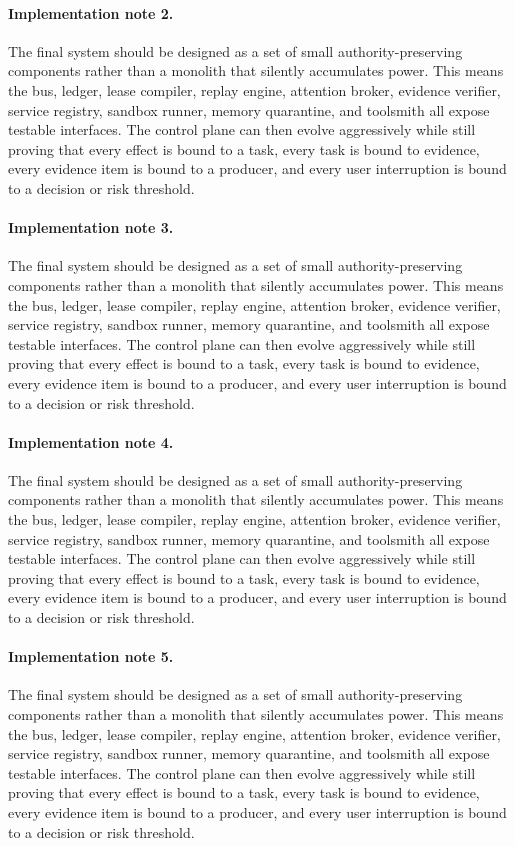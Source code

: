 \documentclass[10pt,journal,onecolumn]{IEEEtran}
\begin{document}
\paragraph{Implementation note 2.} The final system should be designed as a set of small authority-preserving components rather than a monolith that silently accumulates power. This means the bus, ledger, lease compiler, replay engine, attention broker, evidence verifier, service registry, sandbox runner, memory quarantine, and toolsmith all expose testable interfaces. The control plane can then evolve aggressively while still proving that every effect is bound to a task, every task is bound to evidence, every evidence item is bound to a producer, and every user interruption is bound to a decision or risk threshold.
\paragraph{Implementation note 3.} The final system should be designed as a set of small authority-preserving components rather than a monolith that silently accumulates power. This means the bus, ledger, lease compiler, replay engine, attention broker, evidence verifier, service registry, sandbox runner, memory quarantine, and toolsmith all expose testable interfaces. The control plane can then evolve aggressively while still proving that every effect is bound to a task, every task is bound to evidence, every evidence item is bound to a producer, and every user interruption is bound to a decision or risk threshold.
\paragraph{Implementation note 4.} The final system should be designed as a set of small authority-preserving components rather than a monolith that silently accumulates power. This means the bus, ledger, lease compiler, replay engine, attention broker, evidence verifier, service registry, sandbox runner, memory quarantine, and toolsmith all expose testable interfaces. The control plane can then evolve aggressively while still proving that every effect is bound to a task, every task is bound to evidence, every evidence item is bound to a producer, and every user interruption is bound to a decision or risk threshold.
\paragraph{Implementation note 5.} The final system should be designed as a set of small authority-preserving components rather than a monolith that silently accumulates power. This means the bus, ledger, lease compiler, replay engine, attention broker, evidence verifier, service registry, sandbox runner, memory quarantine, and toolsmith all expose testable interfaces. The control plane can then evolve aggressively while still proving that every effect is bound to a task, every task is bound to evidence, every evidence item is bound to a producer, and every user interruption is bound to a decision or risk threshold.
\end{document}

